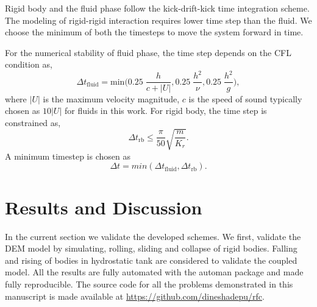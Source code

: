 Rigid body and the fluid phase follow the kick-drift-kick time integration
scheme. The modeling of rigid-rigid interaction requires lower time step than the fluid. We choose the minimum of both the timesteps to move the system forward
in time.

For the numerical stability of fluid phase, the time step depends on the CFL condition as,
\begin{equation}
  \label{eq:rfc:time-step-cfl}
  \Delta t_{\text{fluid}} = \mathrm{min} \bigg( 0.25 \; \frac{h}{c + |U|} ,  0.25 \; \frac{h^2}{\nu},  0.25 \; \frac{h^2}{g} \bigg),
\end{equation}
where $|U|$ is the maximum velocity magnitude, $c$ is the speed of sound
typically chosen as $10 |U|$ for fluids in this work. For rigid body, the time
step is constrained as,
\begin{equation}
  \label{eq:rfc:time-step-body-force}
  \Delta t_{\text{rb}} \leq \frac{\pi}{50} \sqrt{\frac{m}{K_r}}.
\end{equation}
A minimum timestep is chosen as
\begin{equation}
  \label{eq:rfc:time-step-body-force}
  \Delta t = min(\Delta t_{\text{fluid}}, \Delta t_{\text{rb}}).
\end{equation}



\FloatBarrier%
\section{Results and Discussion}
\label{sec:rfc:results}
In the current section we validate the developed schemes. We first, validate the
DEM model by simulating, rolling, sliding and collapse of rigid bodies. Falling
and rising of bodies in hydrostatic tank are considered to validate the coupled
model. All the results are fully automated with the automan package
\parencite{automan2018} and made fully reproducible. The source code for all the
problems demonstrated in this manuscript is made available at
\url{https://github.com/dineshadepu/rfc}.


\FloatBarrier%
